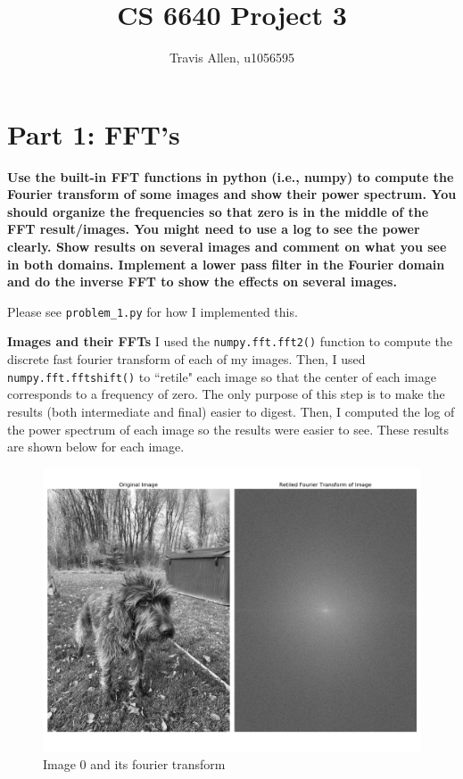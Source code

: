\documentclass[]{article}
\title{CS 6640 Project 3}
\author{Travis Allen, u1056595}
\begin{document}
	\maketitle
	
	\newpage
	\section{Part 1: FFT's}
	\textbf{Use the built-in FFT functions in python (i.e., numpy) to compute the Fourier transform of some images and show their power spectrum.  You should organize the frequencies so that zero is in the middle of the FFT result/images.  You might need to use a log to see the power clearly.   Show results on several images and comment on what you see in both domains.  Implement a lower pass filter in the Fourier domain and do the inverse FFT to show the effects on several images.}

	\vskip 10pt

	Please see \texttt{problem\_1.py} for how I implemented this. 
	
	\vskip 10pt
	
	\textbf{Images and their FFTs}
	I used the \texttt{numpy.fft.fft2()} function to compute the discrete fast fourier transform of each of my images. Then, I used \texttt{numpy.fft.fftshift()} to ``retile" each image so that the center of each image corresponds to a frequency of zero. The only purpose of this step is to make the results (both intermediate and final) easier to digest. Then, I computed the log of the power spectrum of each image so the results were easier to see. These results are shown below for each image.
		
	\begin{figure}[H]
		\centering
		\includegraphics[width=6.5in]{p1_output/img_0_ft_compare.png}
		\caption{Image 0 and its fourier transform}
	\end{figure}
	
\end{document}
